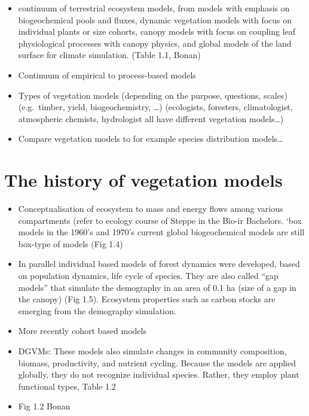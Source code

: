 \documentclass[oneside]{book}
\providecommand{\tightlist}{%
  \setlength{\itemsep}{0pt}\setlength{\parskip}{0pt}}
\begin{document}
\begin{itemize}
\tightlist
\item
  continuum of terrestrial ecosystem models, from models with emphasis
  on biogeochemical pools and fluxes, dynamic vegetation models with
  focus on individual plants or size cohorts, canopy models with focus
  on coupling leaf physiological processes with canopy physics, and
  global models of the land surface for climate simulation. (Table 1.1,
  Bonan)
\item
  Continuum of empirical to process-based models
\item
  Types of vegetation models (depending on the purpose, questions,
  scales) (e.g.~timber, yield, biogeochemistry, \ldots{}) (ecologists,
  foresters, climatologist, atmospheric chemists, hydrologist all have
  different vegetation models\ldots{})
\item
  Compare vegetation models to for example species distribution
  models\ldots{}
\end{itemize}

\section{The history of vegetation
models}\label{the-history-of-vegetation-models}

\begin{itemize}
\tightlist
\item
  Conceptualisation of ecosystem to mass and energy flows among various
  compartments (refer to ecology course of Steppe in the Bio-ir
  Bachelors. `box models in the 1960's and 1970's current global
  biogeochemical models are still box-type of models (Fig 1.4)
\item
  In parallel individual based models of forest dynamics were developed,
  based on population dynamics, life cycle of species. They are also
  called ``gap models'' that simulate the demography in an area of 0.1
  ha (size of a gap in the canopy) (Fig 1.5). Ecosystem properties such
  as carbon stocks are emerging from the demography simulation.
\item
  More recently cohort based models
\item
  DGVMs: These models also simulate changes in community composition,
  biomass, productivity, and nutrient cycling. Because the models are
  applied globally, they do not recognize individual species. Rather,
  they employ plant functional types, Table 1.2
\item
  Fig 1.2 Bonan
\end{itemize}
\end{document}
